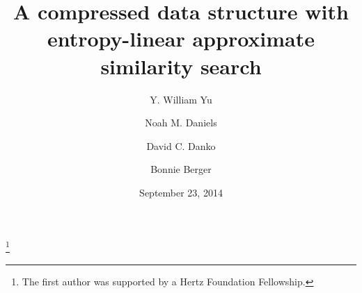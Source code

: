 \documentclass{amsbook}
\theoremstyle{definition}
\theoremstyle{remark}
\numberwithin{equation}{section}
\begin{document}
\title{A compressed data structure with entropy-linear approximate similarity search}

\author{Y. William Yu}
\address{Department of Mathematics, Massachusetts Institute of Technology, Cambridge, Massachusetts 02139}
\thanks{The first author was supported by a Hertz Foundation Fellowship.}

\author{Noah M. Daniels}

\author{David C. Danko}

\author{Bonnie Berger}


\date{September 23, 2014}


\end{document}
